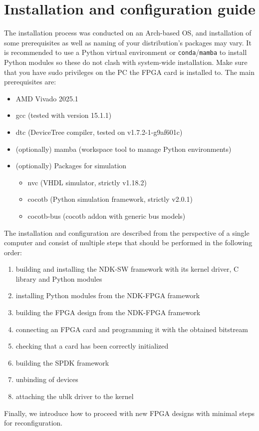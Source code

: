 \chapter{Installation and configuration guide}
\label{chap:spdk_conf}

The installation process was conducted on an Arch-based OS, and installation of some
prerequisites as well as naming of your distribution's packages may vary. It is recommended to use
a Python virtual environment or \verb|conda|/\verb|mamba| to install Python modules so these do not
clash with system-wide installation. Make sure that you have sudo privileges on the PC the FPGA card
is installed to. The main prerequisites are:
\begin{itemize}
    \item AMD Vivado 2025.1
    \item gcc (tested with version 15.1.1)
    \item dtc (DeviceTree compiler, tested on v1.7.2-1-g9af601c)
    \item (optionally) mamba (workspace tool to manage Python environments)
    \item (optionally) Packages for simulation
    \begin{itemize}
        \item nvc (VHDL simulator, strictly v1.18.2)\cite{nvc_sim}
        \item cocotb (Python simulation framework, strictly v2.0.1)\cite{cocotb_homepage}
        \item cocotb-bus (cocotb addon with generic bus models)\cite{cocotb_bus}
    \end{itemize}
\end{itemize}

The installation and configuration are described from the perspective of a single computer and consist of
multiple steps that should be performed in the following order:
\begin{enumerate}
    \item building and installing the NDK-SW framework with its kernel driver, C library and Python
    modules
    \item installing Python modules from the NDK-FPGA framework
    \item building the FPGA design from the NDK-FPGA framework
    \item connecting an FPGA card and programming it with the obtained bitstream
    \item checking that a card has been correctly initialized
    \item building the SPDK framework
    \item unbinding of devices
    \item attaching the ublk driver to the kernel
\end{enumerate}
Finally, we introduce how to proceed with new FPGA designs with minimal steps for
reconfiguration.

